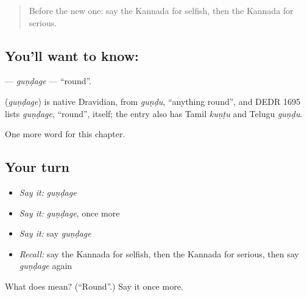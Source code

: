 \label{lesson:KA-C255-gundage}



\begin{quote}
Before the new one: say the Kannada for selfish, then the Kannada for serious.
\end{quote}

\subsection*{You'll want to know: }
\textbf{} — \emph{guṇḍage} — \textquotedblleft{}round\textquotedblright{}.

\begin{cousinweb}
\textbf{} (\emph{guṇḍage}) is native Dravidian, from \emph{guṇḍu}, \textquotedblleft{}anything round\textquotedblright{}, and DEDR 1695 lists \emph{guṇḍage}, \textquotedblleft{}round\textquotedblright{}, itself; the entry also has Tamil \emph{kuṇṭu} and Telugu \emph{guṇḍu}.
\end{cousinweb}

\begin{grammarlens}[title={What you've built}]
One more word for this chapter.
\end{grammarlens}

\subsection*{Your turn}
\begin{itemize}
\raggedright
  \item \emph{Say it:} \emph{guṇḍage}
  \item \emph{Say it:} \emph{guṇḍage}, once more
  \item \emph{Say it:} say \emph{guṇḍage}
  \item \emph{Recall:} say the Kannada for selfish, then the Kannada for serious, then say \emph{guṇḍage} again
\end{itemize}

\begin{tcolorbox}[breakable,colback=teal!4,colframe=teal!35!black,title={Before you move on}]
What does  mean? (\textquotedblleft{}Round\textquotedblright{}.) Say it once more.
\end{tcolorbox}
